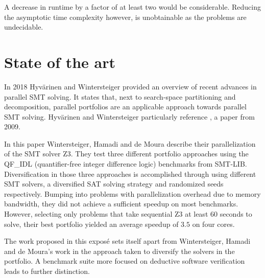\documentclass{scrartcl}
\begin{document}
A decrease in runtime by a factor of at least two would be considerable.
Reducing the asymptotic time complexity however, is unobtainable
as the problems are undecidable.

\section{State of the art}
In 2018 Hyvärinen and Wintersteiger \cite{HJW2018} provided an overview of
recent advances in parallel SMT solving.
It states that, next to search-space partitioning and decomposition,
parallel portfolios are an applicable approach towards parallel SMT solving.
Hyvärinen and Wintersteiger particularly reference \cite{WHM2009}, a paper from 2009.

In this paper Wintersteiger, Hamadi and de Moura describe their parallelization of the
SMT solver Z3.
They test three different portfolio approaches using the QF\_IDL
(quantifier-free integer difference logic) benchmarks from SMT-LIB.
Diversification in those three approaches is accomplished through using
different SMT solvers, a diversified SAT solving strategy
and randomized seeds respectively.
Bumping into problems with parallelization overhead due to memory bandwidth,
they did not achieve a sufficient speedup on most benchmarks.
However, selecting only problems that take sequential Z3 at least 60 seconds to solve,
their best portfolio yielded an average speedup of \(3.5\) on four cores.

The work proposed in this exposé sets itself apart from Wintersteiger, Hamadi and de Moura's work
in the approach taken to diversify the solvers in the portfolio.
A benchmark suite more focused on deductive software verification leads to further distinction.
\end{document}
